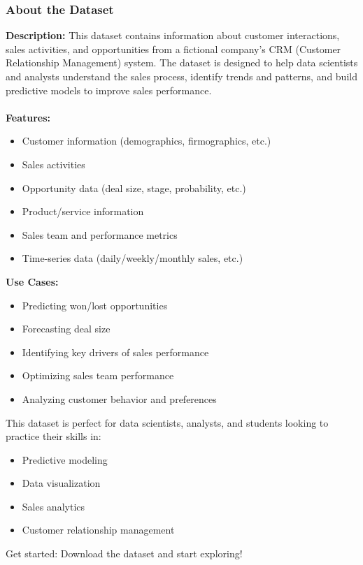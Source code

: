 \documentclass{article}
\begin{document}
\subsubsection{About the Dataset}
\textbf{Description:}
This dataset contains information about customer interactions, sales activities, and opportunities from a fictional company's CRM (Customer Relationship Management) system. The dataset is designed to help data scientists and analysts understand the sales process, identify trends and patterns, and build predictive models to improve sales performance.
\\
\\
\noindent \textbf{Features:}
\begin{itemize}
    \item Customer information (demographics, firmographics, etc.)
    \item Sales activities
    \item Opportunity data (deal size, stage, probability, etc.)
    \item Product/service information
    \item Sales team and performance metrics
    \item Time-series data (daily/weekly/monthly sales, etc.)
\end{itemize}

\noindent \textbf{Use Cases:}
\begin{itemize}
    \item Predicting won/lost opportunities
    \item Forecasting deal size
    \item Identifying key drivers of sales performance
    \item Optimizing sales team performance
    \item Analyzing customer behavior and preferences
\end{itemize}

This dataset is perfect for data scientists, analysts, and students looking to practice their skills in:
\begin{itemize}
    \item Predictive modeling
    \item Data visualization
    \item Sales analytics
    \item Customer relationship management
\end{itemize}

Get started: Download the dataset and start exploring!
\end{document}
